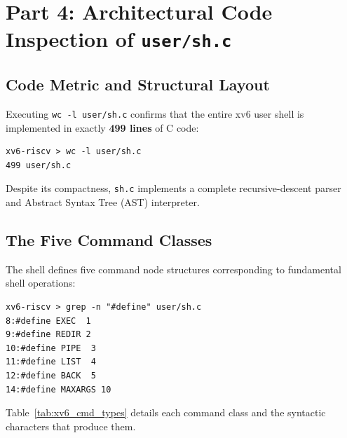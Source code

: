 \documentclass[12pt,a4paper]{article}
\begin{document}
\section{Part 4: Architectural Code Inspection of \texttt{user/sh.c}}

\subsection{Code Metric and Structural Layout}
Executing \texttt{wc -l user/sh.c} confirms that the entire xv6 user shell is implemented in exactly \textbf{499 lines} of C code:
\begin{lstlisting}[style=consolestyle]
xv6-riscv > wc -l user/sh.c
499 user/sh.c
\end{lstlisting}

Despite its compactness, \texttt{sh.c} implements a complete recursive-descent parser and Abstract Syntax Tree (AST) interpreter.

\subsection{The Five Command Classes}
The shell defines five command node structures corresponding to fundamental shell operations:
\begin{lstlisting}[style=consolestyle, caption={Command types defined in user/sh.c}]
xv6-riscv > grep -n "#define" user/sh.c
8:#define EXEC  1
9:#define REDIR 2
10:#define PIPE  3
11:#define LIST  4
12:#define BACK  5
14:#define MAXARGS 10
\end{lstlisting}

Table~\ref{tab:xv6_cmd_types} details each command class and the syntactic characters that produce them.
\end{document}
